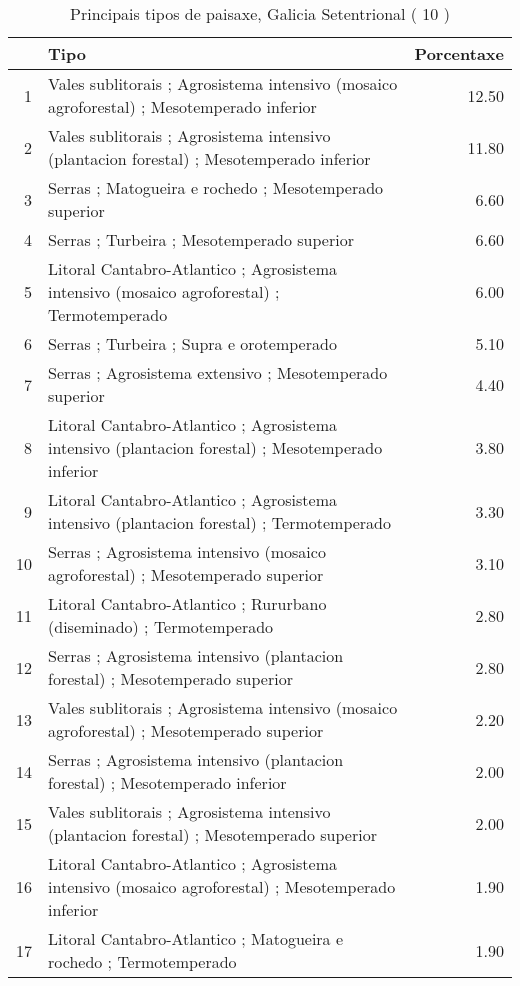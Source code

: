\begin{table}[p]
\centering
\caption{Principais tipos de paisaxe,  Galicia Setentrional ( 10 )} 
\label{Tipos 10}
\begin{tabular}{rlr}
  \hline
 & Tipo & Porcentaxe \\ 
  \hline
1 & Vales sublitorais ; Agrosistema intensivo (mosaico agroforestal) ; Mesotemperado inferior & 12.50 \\ 
  2 & Vales sublitorais ; Agrosistema intensivo (plantacion forestal) ; Mesotemperado inferior & 11.80 \\ 
  3 & Serras ; Matogueira e rochedo ; Mesotemperado superior & 6.60 \\ 
  4 & Serras ; Turbeira ; Mesotemperado superior & 6.60 \\ 
  5 & Litoral Cantabro-Atlantico ; Agrosistema intensivo (mosaico agroforestal) ; Termotemperado & 6.00 \\ 
  6 & Serras ; Turbeira ; Supra e orotemperado & 5.10 \\ 
  7 & Serras ; Agrosistema extensivo ; Mesotemperado superior & 4.40 \\ 
  8 & Litoral Cantabro-Atlantico ; Agrosistema intensivo (plantacion forestal) ; Mesotemperado inferior & 3.80 \\ 
  9 & Litoral Cantabro-Atlantico ; Agrosistema intensivo (plantacion forestal) ; Termotemperado & 3.30 \\ 
  10 & Serras ; Agrosistema intensivo (mosaico agroforestal) ; Mesotemperado superior & 3.10 \\ 
  11 & Litoral Cantabro-Atlantico ; Rururbano (diseminado) ; Termotemperado & 2.80 \\ 
  12 & Serras ; Agrosistema intensivo (plantacion forestal) ; Mesotemperado superior & 2.80 \\ 
  13 & Vales sublitorais ; Agrosistema intensivo (mosaico agroforestal) ; Mesotemperado superior & 2.20 \\ 
  14 & Serras ; Agrosistema intensivo (plantacion forestal) ; Mesotemperado inferior & 2.00 \\ 
  15 & Vales sublitorais ; Agrosistema intensivo (plantacion forestal) ; Mesotemperado superior & 2.00 \\ 
  16 & Litoral Cantabro-Atlantico ; Agrosistema intensivo (mosaico agroforestal) ; Mesotemperado inferior & 1.90 \\ 
  17 & Litoral Cantabro-Atlantico ; Matogueira e rochedo ; Termotemperado & 1.90 \\ 

\end{tabular}
\end{table}
